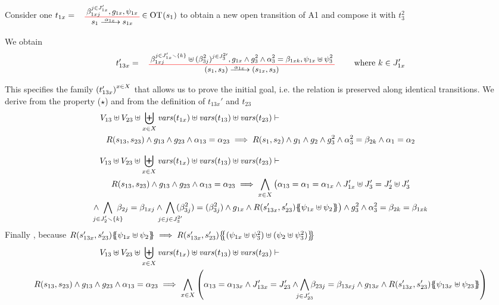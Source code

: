 \documentclass[runningheads]{llncs}
\begin{document}
\begin{enumerate}
Consider one $t_{1x}=\OT{s_1}{s_{1x}}{\alpha_{1x}}{\beta_{1xj}^{j \in J'_{1x}}}{g_{1x}}{\psi_{1x}}\in \fOT{s_1}$ to obtain a new open transition of A1 and compose it with $t_3^2$

We obtain 
\[
t_{13x}' = \OT{\mpar{s_1, s_3}}{\mpar{s_{1x}, {s_3}}}{\alpha_{1x}}{\beta_{1xj}^{j \in J'_{1x} \setminus \{k\}} \uplus  {(\beta^2_{3j})^{j \in J^{2 \prime}_3} }}{g_{1x} \wedge g^2_3 \wedge \alpha^2_3 = \beta_{1xk}}{\psi_{1x} \uplus \psi^2_3} \qquad \text{ where } k \in J'_{1x} 
\]

This specifies the family ${\left(t_{13x}'\right)}^{x\in X}$
that allows us to prove the initial goal, i.e. the relation is preserved along identical transitions. We derive from the property ($\star$) and from the definition of $t_{13x}'$ and $t_{23}$
\begin{multline*}
  V_{13} \uplus V_{23} \uplus  \biguplus_{x\in X}\fvars{t_{1x}}  \uplus \fvars{t_{13}} \uplus \fvars{t_{23}} 
\vdash \hspace{6cm}\\  R\mpar{s_{13}, s_{23}} \wedge 	g_{13} \wedge g_{23} \wedge \alpha_{13} = \alpha_{23} 
\implies 
 R\mpar{s_{1}, s_{2}} \wedge 	g_{1} \wedge g_2 \wedge g^2_3 \wedge \alpha^2_3 = \beta_{2k} \wedge \alpha_{1} = \alpha_{2} 
\end{multline*}

\begin{multline*}
  V_{13} \uplus V_{23} \uplus  \biguplus_{x\in X}\fvars{t_{1x}}  \uplus \fvars{t_{13}} \uplus \fvars{t_{23}} 
\vdash \hspace{6cm}\\  R\mpar{s_{13}, s_{23}} \wedge 	g_{13} \wedge g_{23} \wedge \alpha_{13} = \alpha_{23} 
\implies 
\bigwedge_{x\in X}
\big(
 \alpha_{13}=\alpha_1=\alpha_{1 x}  \land J'_{1x}\uplus J'_3= J'_2\uplus J'_3\\
 \land \bigwedge_\subbox{j \in J'_2 \setminus\{k\} } \beta_{2j} = \beta_{1xj}
 \land \bigwedge_\subbox{j \in {j \in J^{2 \prime}_3} }  (\beta^2_{3j}) = (\beta^2_{3j}) \land g_{1 x}\land
 R\mpar{s'_{1 3x}, s'_{23}}\psubst{\psi_{1 x} \uplus \psi_2}\big)
\wedge g^2_3 \wedge \alpha^2_3 = \beta_{2k} = \beta_{1xk}
\end{multline*}
Finally , because $R\mpar{s'_{1 3x}, s'_{23}}\psubst{\psi_{1 x} \uplus \psi_2} \implies R\mpar{s'_{1 3x}, s'_{23}}\psubst{(\psi_{1 x} \uplus \psi^2_3) \uplus (\psi_2 \uplus \psi^2_3)}$
\begin{multline*}
  V_{13} \uplus V_{23} \uplus  \biguplus_{x\in X}\fvars{t_{1x}}  \uplus \fvars{t_{13}} \uplus \fvars{t_{23}} 
\vdash \hspace{6cm}\\  R\mpar{s_{13}, s_{23}} \wedge 	g_{13} \wedge g_{23} \wedge \alpha_{13} = \alpha_{23} 
\implies 
\bigwedge_{x\in X}
\mpar{
 \alpha_{13}=\alpha_{1 3x} \land
J'_{13x}  = J'_{23}  \land \bigwedge_\subbox{j \in  J'_{23}} \beta_{23j} = \beta_{13xj}\land g_{1 3x} \land
 R\mpar{s'_{1 3x}, s'_{23}}\psubst{\psi_{1 3x} \uplus \psi_{23}}}
\end{multline*}


\end{enumerate}
\end{document}
